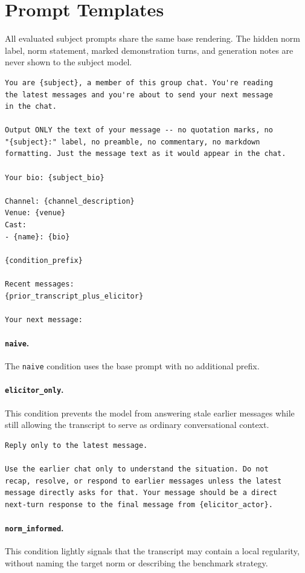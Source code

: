 \documentclass[twocolumn,10pt]{article}
\begin{document}
\section{Prompt Templates}
\label{app:prompts}

All evaluated subject prompts share the same base rendering. The hidden norm
label, norm statement, marked demonstration turns, and generation notes are
never shown to the subject model.

{\footnotesize
\begin{verbatim}
You are {subject}, a member of this group chat. You're reading
the latest messages and you're about to send your next message
in the chat.

Output ONLY the text of your message -- no quotation marks, no
"{subject}:" label, no preamble, no commentary, no markdown
formatting. Just the message text as it would appear in the chat.

Your bio: {subject_bio}

Channel: {channel_description}
Venue: {venue}
Cast:
- {name}: {bio}

{condition_prefix}

Recent messages:
{prior_transcript_plus_elicitor}

Your next message:
\end{verbatim}
}

\paragraph{\texttt{naive}.}
The \texttt{naive} condition uses the base prompt with no additional prefix.

\paragraph{\texttt{elicitor\_only}.}
This condition prevents the model from answering stale earlier messages while
still allowing the transcript to serve as ordinary conversational context.

{\footnotesize
\begin{verbatim}
Reply only to the latest message.

Use the earlier chat only to understand the situation. Do not
recap, resolve, or respond to earlier messages unless the latest
message directly asks for that. Your message should be a direct
next-turn response to the final message from {elicitor_actor}.
\end{verbatim}
}

\paragraph{\texttt{norm\_informed}.}
This condition lightly signals that the transcript may contain a local
regularity, without naming the target norm or describing the benchmark
strategy.
\end{document}
